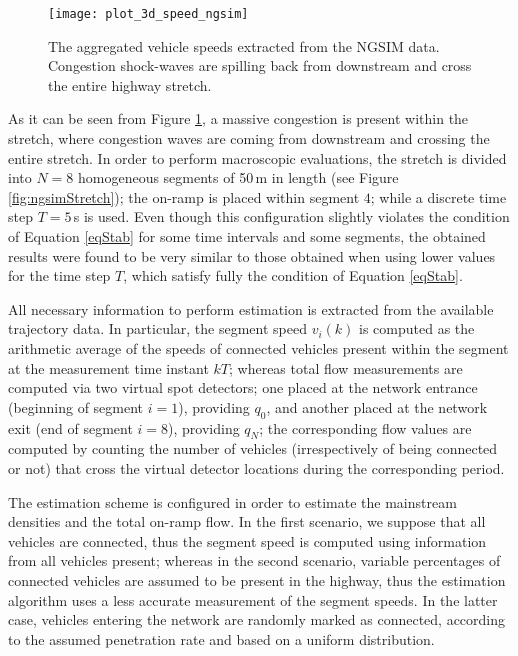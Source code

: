 \documentclass[titlepage,oneside,fleqn,12pt]{article}
\begin{document}
\begin{figure}
\begin{center}
	\texttt{[image: plot\_3d\_speed\_ngsim]}
	\caption{The aggregated vehicle speeds extracted from the NGSIM data. Congestion shock-waves are spilling back from downstream and cross the entire highway stretch.} 
	\label{fig:ngsim3d}
\end{center}
\end{figure}

As it can be seen from Figure \ref{fig:ngsim3d}, a massive congestion is present within the stretch, where congestion waves are coming from downstream and crossing the entire stretch.
In order to perform macroscopic evaluations, the stretch is divided into $N=8$ homogeneous segments of 50\,m in length (see Figure \ref{fig:ngsimStretch}); the on-ramp is placed within segment $4$; while a discrete time step $T=5\,$s is used. Even though this configuration slightly violates the condition of Equation \ref{eqStab} for some time intervals and some segments, the obtained results were found to be very similar to those obtained when using lower values for the time step $T$, which satisfy fully the condition of Equation \ref{eqStab}.

All necessary information to perform estimation is extracted from the available trajectory data. In particular, the segment speed $v_i(k)$ is computed as the arithmetic average of the speeds of connected vehicles present within the segment at the measurement time instant $kT$; whereas total flow measurements are computed via two virtual spot detectors; one placed at the network entrance (beginning of segment $i=1$), providing $q_0$, and another placed at the network exit (end of segment $i=8$), providing $q_N$; the corresponding flow values are computed by counting the number of vehicles (irrespectively of being connected or not) that cross the virtual detector locations during the corresponding period.

The estimation scheme is configured in order to estimate the mainstream densities and the total on-ramp flow. In the first scenario, we suppose that all vehicles are connected, thus the segment speed is computed using information from all vehicles present; whereas in the second scenario, variable percentages of connected vehicles are assumed to be present in the highway, thus the estimation algorithm uses a less accurate measurement of the segment speeds. In the latter case, vehicles entering the network are randomly marked as connected, according to the assumed penetration rate and based on a uniform distribution.
\end{document}
